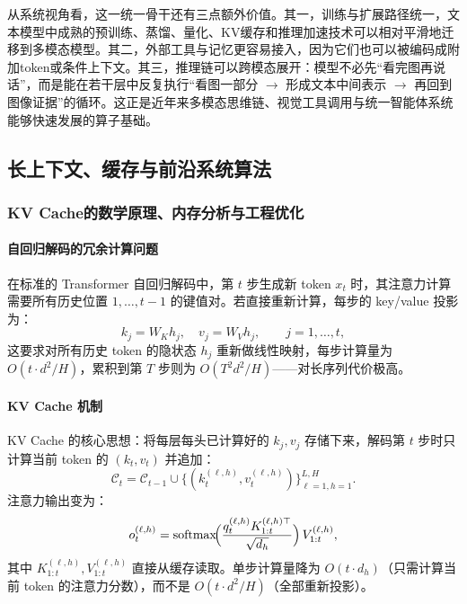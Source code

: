 \documentclass[12pt,a4paper]{article}
\begin{document}
从系统视角看，这一统一骨干还有三点额外价值。其一，训练与扩展路径统一，文本模型中成熟的预训练、蒸馏、量化、KV缓存和推理加速技术可以相对平滑地迁移到多模态模型。其二，外部工具与记忆更容易接入，因为它们也可以被编码成附加token或条件上下文。其三，推理链可以跨模态展开：模型不必先“看完图再说话”，而是能在若干层中反复执行“看图一部分 $\rightarrow$ 形成文本中间表示 $\rightarrow$ 再回到图像证据”的循环。这正是近年来多模态思维链、视觉工具调用与统一智能体系统能够快速发展的算子基础。

\subsection{长上下文、缓存与前沿系统算法}

\subsubsection{KV Cache的数学原理、内存分析与工程优化}
\label{sec:kv-cache}

\paragraph{自回归解码的冗余计算问题}

在标准的 Transformer 自回归解码中，第 $t$ 步生成新 token $x_t$ 时，其注意力计算需要所有历史位置 $1,\ldots,t-1$ 的键值对。若直接重新计算，每步的 key/value 投影为：
\begin{equation}
k_j = W_K h_j,\quad v_j = W_V h_j, \qquad j = 1,\ldots,t,
\end{equation}
这要求对所有历史 token 的隐状态 $h_j$ 重新做线性映射，每步计算量为 $O(t \cdot d^2 / H)$，累积到第 $T$ 步则为 $O(T^2 d^2 / H)$——对长序列代价极高。

\paragraph{KV Cache 机制}

KV Cache 的核心思想：将每层每头已计算好的 $k_j, v_j$ 存储下来，解码第 $t$ 步时只计算当前 token 的 $(k_t, v_t)$ 并追加：
\begin{equation}
\mathcal{C}_{t} = \mathcal{C}_{t-1} \cup \{(k_t^{(\ell,h)}, v_t^{(\ell,h)})\}_{\ell=1,h=1}^{L,H}.
\end{equation}
注意力输出变为：
\begin{equation}
o_t^{(\ell,h)} = \text{softmax}\!\Bigl(\frac{q_t^{(\ell,h)} K_{1:t}^{(\ell,h)\top}}{\sqrt{d_h}}\Bigr)\, V_{1:t}^{(\ell,h)},
\end{equation}
其中 $K_{1:t}^{(\ell,h)}, V_{1:t}^{(\ell,h)}$ 直接从缓存读取。单步计算量降为 $O(t \cdot d_h)$（只需计算当前 token 的注意力分数），而不是 $O(t \cdot d^2/H)$（全部重新投影）。
\end{document}
